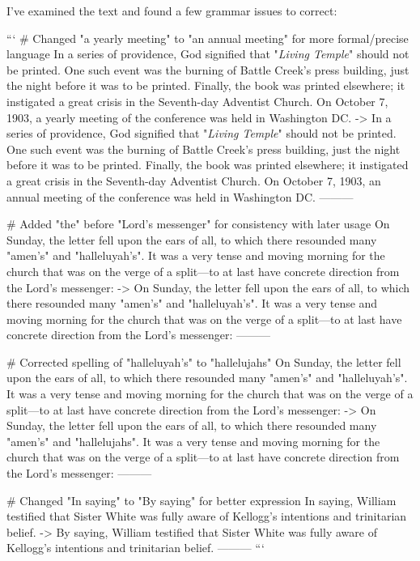 I've examined the text and found a few grammar issues to correct:

```
# Changed "a yearly meeting" to "an annual meeting" for more formal/precise language
In a series of providence, God signified that "\textit{Living Temple}" should not be printed. One such event was the burning of Battle Creek's press building, just the night before it was to be printed. Finally, the book was printed elsewhere; it instigated a great crisis in the Seventh-day Adventist Church. On October 7, 1903, a yearly meeting of the conference was held in Washington DC.
->
In a series of providence, God signified that "\textit{Living Temple}" should not be printed. One such event was the burning of Battle Creek's press building, just the night before it was to be printed. Finally, the book was printed elsewhere; it instigated a great crisis in the Seventh-day Adventist Church. On October 7, 1903, an annual meeting of the conference was held in Washington DC.
---------

# Added "the" before "Lord's messenger" for consistency with later usage
On Sunday, the letter fell upon the ears of all, to which there resounded many "amen's" and "halleluyah's". It was a very tense and moving morning for the church that was on the verge of a split—to at last have concrete direction from the Lord's messenger:
->
On Sunday, the letter fell upon the ears of all, to which there resounded many "amen's" and "halleluyah's". It was a very tense and moving morning for the church that was on the verge of a split—to at last have concrete direction from the Lord's messenger:
---------

# Corrected spelling of "halleluyah's" to "hallelujahs"
On Sunday, the letter fell upon the ears of all, to which there resounded many "amen's" and "halleluyah's". It was a very tense and moving morning for the church that was on the verge of a split—to at last have concrete direction from the Lord's messenger:
->
On Sunday, the letter fell upon the ears of all, to which there resounded many "amen's" and "hallelujahs". It was a very tense and moving morning for the church that was on the verge of a split—to at last have concrete direction from the Lord's messenger:
---------

# Changed "In saying" to "By saying" for better expression
In saying, William testified that Sister White was fully aware of Kellogg's intentions and trinitarian belief.
->
By saying, William testified that Sister White was fully aware of Kellogg's intentions and trinitarian belief.
---------
```